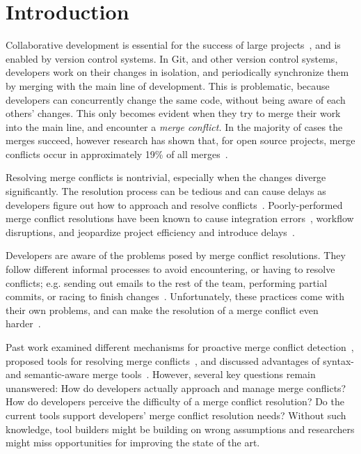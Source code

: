 
\section{Introduction}\label{introduction}

Collaborative development is essential for the success of large projects~\cite{hattori2010syde}, and is enabled by version control systems. 
In Git, and other version control systems, developers work on their changes in isolation, and periodically synchronize them by merging with the main line of development. 
This is problematic, because developers can concurrently change the same code, without being aware of each others' changes.
This only becomes evident when they try to merge their work into the main line, and encounter a \emph{merge conflict.}
In the majority of cases the merges succeed, however research has shown that, for open source projects, merge conflicts occur in approximately 19\% of all merges~\cite{cassandra,Brun2011}.

Resolving merge conflicts is nontrivial, especially when the changes diverge significantly.
The resolution process can be tedious and can cause delays as developers figure out how to approach and resolve conflicts~\cite{cassandra}. 
Poorly-performed merge conflict resolutions have been known to cause integration errors~\cite{bird-branches-conflict}, workflow disruptions, and jeopardize project efficiency and introduce delays~\cite{estler2014awareness}. 

Developers are aware of the problems posed by merge conflict resolutions.
They follow different informal processes to avoid encountering, or having to resolve conflicts; e.g. sending out emails to the rest of the team, performing partial commits, or racing to finish changes~\cite{deSouza2003breaking,cataldo2008distributed_dev}.
Unfortunately, these practices come with their own problems, and can make the resolution of a merge conflict even harder~\cite{Brun2011}. 

Past work examined different mechanisms for proactive merge conflict detection~\cite{Brun2011,palantir,Guimaraes}, proposed tools for resolving merge conflicts~\cite{nishimura,mens2002state}, and discussed advantages of syntax- and semantic-aware merge tools~\cite{danny_refactorings,hunt2002extensible,apel_semistructured_2011}. 
However, several key questions remain unanswered: 
How do developers actually approach and manage merge conflicts?
How do developers perceive the difficulty of a merge conflict resolution? 
Do the current tools support developers' merge conflict resolution needs?
Without such knowledge, tool builders might be building on wrong assumptions and researchers might miss opportunities for improving the state of the art.

